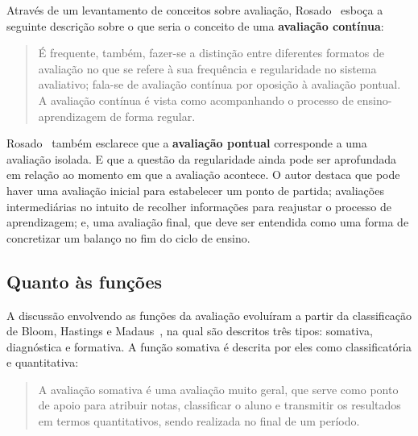 Através de um levantamento de conceitos sobre avaliação, Rosado~\cite{rosado@conceitos} esboça a seguinte descrição sobre o que seria o conceito de uma \textbf{avaliação contínua}:
\begin{quote}
É frequente, também, fazer-se a distinção entre diferentes formatos de avaliação no que se refere à sua frequência e regularidade no sistema avaliativo; fala-se de avaliação contínua por oposição à avaliação pontual. A avaliação contínua é vista como acompanhando o processo de ensino-aprendizagem de forma regular.~\cite{rosado@conceitos}
\end{quote}%

Rosado~\cite{rosado@conceitos} também esclarece que a \textbf{avaliação pontual} corresponde a uma avaliação isolada. E que a questão da regularidade ainda pode ser aprofundada em relação ao momento em que a avaliação acontece. O autor destaca que pode haver uma avaliação inicial para estabelecer um ponto de partida; avaliações intermediárias no intuito de recolher informações para reajustar o processo de aprendizagem; e, uma avaliação final, que deve ser entendida como uma forma de concretizar um balanço no fim do ciclo de ensino. 





\subsection{Quanto às funções}%

A discussão envolvendo as funções da avaliação evoluíram a partir da classificação de Bloom, Hastings e Madaus~\cite{bloom1983manual}, na qual são descritos três tipos: somativa, diagnóstica e formativa. A função somativa é descrita por eles como classificatória e quantitativa:

\begin{quote}
A avaliação somativa é uma avaliação muito geral, que serve como ponto de apoio para atribuir notas, classificar o aluno e transmitir os resultados em termos quantitativos, sendo realizada no final de um período.~\cite{bloom1983manual}
\end{quote}

